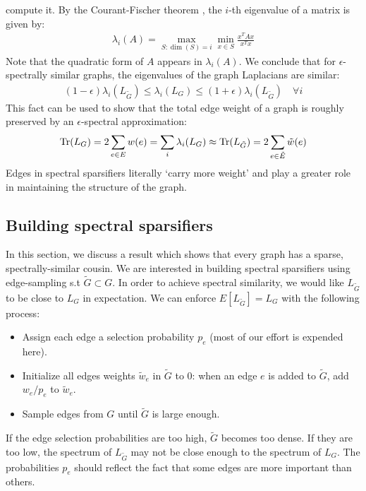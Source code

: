 \documentclass{article}
\begin{document}
compute it. By the Courant-Fischer theorem \cite{CourantFischer}, the $i$-th
eigenvalue of a matrix is given by:
\begin{align*}
    \lambda_i(A) = \max_{S: \dim(S) = i} \min_{x \in S} \frac{x^TAx}{x^Tx}
\end{align*}
Note that the quadratic form of $A$ appears in $\lambda_i(A)$. We conclude
that for $\epsilon$-spectrally similar graphs, the eigenvalues of the graph
Laplacians are similar:
\begin{align*}
    (1 - \epsilon)\lambda_i(L_{\tilde{G}}) \leq \lambda_i(L_G) \leq (1 +
    \epsilon)\lambda_i(L_{\tilde{G}}) \quad \forall{i}
\end{align*}
This fact can be used to show that the total edge weight of a graph is
roughly preserved by an $\epsilon$-spectral approximation:
\begin{align*}
    \text{Tr}(L_G) = 2\sum_{e \in E} w(e) = \sum_i \lambda_i(L_G) \approx
    \text{Tr}(L_{\tilde{G}}) = 2\sum_{e \in \tilde{E}} \tilde{w}(e)
\end{align*}
Edges in spectral sparsifiers literally `carry more weight' and play a
greater role in maintaining the structure of the graph.

\subsection{Building spectral sparsifiers}

In this section, we discuss a result which shows that every graph has a
sparse, spectrally-similar cousin. We are interested in building spectral
sparsifiers using edge-sampling s.t $\tilde{G} \subset G$. In order to
achieve spectral similarity, we would like $L_{\tilde{G}}$ to be close to
$L_G$ in expectation. We can enforce $E[L_{\tilde{G}}] = L_G$ with the
following process:
\begin{itemize}
    \item Assign each edge a selection probability $p_e$ (most of our effort
        is expended here).
    \item Initialize all edges weights $\tilde{w}_e$ in $\tilde{G}$ to 0:
        when an edge $e$ is added to $\tilde{G}$, add $w_e/p_e$ to
        $\tilde{w}_e$.
    \item Sample edges from $G$ until $\tilde{G}$ is large enough.
\end{itemize}

If the edge selection probabilities are too high, $\tilde{G}$ becomes too
dense. If they are too low, the spectrum of $L_{\tilde{G}}$ may not be close
enough to the spectrum of $L_G$. The probabilities $p_e$ should reflect the
fact that some edges are more important than others.
\end{document}
